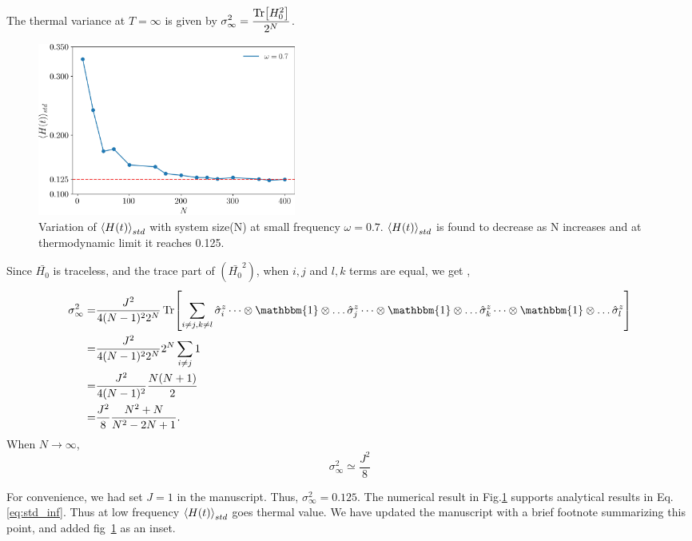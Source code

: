 \documentclass[aps,prb,reprint,showpacs,floatfix,superscriptaddress, onecolumn, nofootinbib, 9pt]{revtex4-2}
\begin{document}
\begin{enumerate}
{			The thermal variance at $T= \infty$ is given by $\displaystyle \sigma^2_{\infty} = \frac{\Tr[H^2_0]}{2^N}$. 
			
			\begin{figure}[h!]
				\includegraphics[width=8.5cm]{hbar_avg_std_w0.7.jpg}
				\caption{Variation of $\expval{H(t)}_{std}$ with system size(N) at small frequency $\omega=0.7$. $\expval{H(t)}_{std}$ is found to decrease as N increases and at thermodynamic limit it reaches 0.125.}
				\label{fig:std_Ns}
			\end{figure}
			
			Since $\bar{H_0}$ is traceless, and the trace part of $\left(\bar{H_0}^2\right)$, when $i,j$ and $l,k$ terms are equal, we get ,
			\begin{align*}
				\sigma_\infty^2 =& \frac{J^2}{4(N-1)^2 2^N}\Tr[\sum_{i\neq j, k \neq l} \hat{\sigma}^z_i \dots\otimes \mathbbm{1} \otimes \dots \hat{\sigma}^z_j \dots\otimes \mathbbm{1} \otimes \dots \hat{\sigma}^z_k\dots\otimes \mathbbm{1} \otimes \dots \hat{\sigma}^z_l ]\\
				=& \frac{J^2}{4(N-1)^2 2^N}   2^N \sum_{i\neq j} 1\\
				=& \frac{J^2}{4(N-1)^2} \frac{N(N+1)}{2}\\
				=& \frac{J^2}{8} \frac{N^2+N}{N^2-2N+1}.
			\end{align*}
			When $N\rightarrow \infty$,
			\begin{equation}
				\sigma_\infty^2 \simeq \frac{J^2}{8}
				\label{eq:std_inf}
			\end{equation} 
			
			For convenience, we had set $J=1$ in the manuscript. Thus, $\sigma_\infty^2 = 0.125$. The numerical result in Fig.\ref{fig:std_Ns} supports analytical results in Eq. \eqref{eq:std_inf}. Thus at low frequency $\expval{H(t)}_{std}$ goes thermal value. We have updated the manuscript with a brief footnote summarizing this point, and added fig~\ref{fig:std_Ns} as an inset.
		}
		

\end{enumerate}
\end{document}
